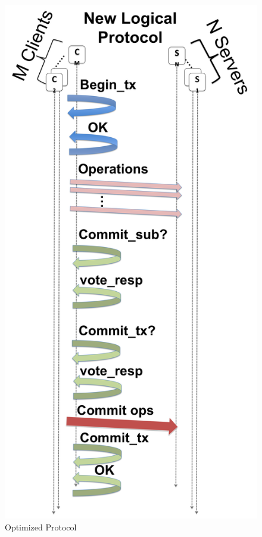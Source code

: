 \documentclass[conference]{IEEEtran}
\begin{document}
\begin{figure}[ht]
\centering
\includegraphics[keepaspectratio=true, width=0.9\columnwidth]{images/optimized-protocol}
\vspace{-0.15in}
\caption{Optimized Protocol}
\label{fig:optimized-protocol}
\end{figure}
\end{document}
